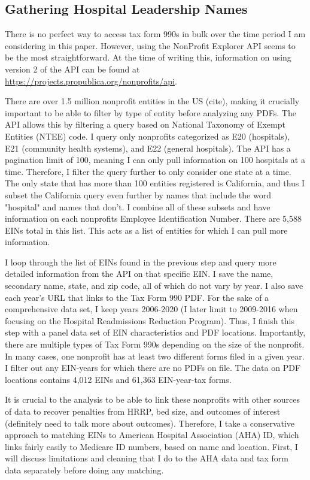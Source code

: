 \documentclass[12pt]{article}
\begin{document}
    \subsection{Gathering Hospital Leadership Names}

    There is no perfect way to access tax form 990s in bulk over the time period I am considering in this paper. However, using the NonProfit Explorer API seems to be the most straightforward. At the time of writing this, information on using version 2 of the API can be found at \hyperlink{https://projects.propublica.org/nonprofits/api}{https://projects.propublica.org/nonprofits/api}. 
    
    There are over 1.5 million nonprofit entities in the US (cite), making it crucially important to be able to filter by type of entity before analyzing any PDFs. The API allows this by filtering a query based on National Taxonomy of Exempt Entities (NTEE) code. I query only nonprofits categorized as E20 (hospitals), E21 (community health systems), and E22 (general hospitals). The API has a pagination limit of 100, meaning I can only pull information on 100 hospitals at a time. Therefore, I filter the query further to only consider one state at a time. The only state that has more than 100 entities registered is California, and thus I subset the California query even further by names that include the word "hospital" and names that don't. I combine all of these subsets and have information on each nonprofits Employee Identification Number. There are 5,588 EINs total in this list. This acts as a list of entities for which I can pull more information. 

    I loop through the list of EINs found in the previous step and query more detailed information from the API on that specific EIN. I save the name, secondary name, state, and zip code, all of which do not vary by year. I also save each year's URL that links to the Tax Form 990 PDF. For the sake of a comprehensive data set, I keep years 2006-2020 (I later limit to 2009-2016 when focusing on the Hospital Readmissions Reduction Program). Thus, I finish this step with a panel data set of EIN characteristics and PDF locations. Importantly, there are multiple types of Tax Form 990s depending on the size of the nonprofit. In many cases, one nonprofit has at least two different forms filed in a given year. I filter out any EIN-years for which there are no PDFs on file. The data on PDF locations contains 4,012 EINs and 61,363 EIN-year-tax forms.

    It is crucial to the analysis to be able to link these nonprofits with other sources of data to recover penalties from HRRP, bed size, and outcomes of interest (definitely need to talk more about outcomes). Therefore, I take a conservative approach to matching EINs to American Hospital Association (AHA) ID, which links fairly easily to Medicare ID numbers, based on name and location. First, I will discuss limitations and cleaning that I do to the AHA data and tax form data separately before doing any matching. 
\end{document}
